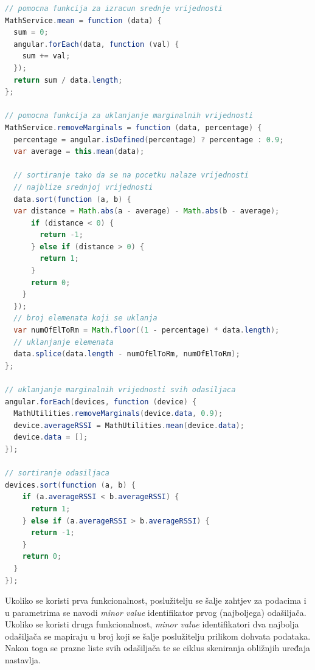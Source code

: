 \begin{lstlisting}[language=java, morekeywords={var,function}]
// pomocna funkcija za izracun srednje vrijednosti
MathService.mean = function (data) {
  sum = 0;
  angular.forEach(data, function (val) {
    sum += val;
  });
  return sum / data.length;
};

// pomocna funkcija za uklanjanje marginalnih vrijednosti
MathService.removeMarginals = function (data, percentage) {
  percentage = angular.isDefined(percentage) ? percentage : 0.9;
  var average = this.mean(data);
  
  // sortiranje tako da se na pocetku nalaze vrijednosti
  // najblize srednjoj vrijednosti
  data.sort(function (a, b) {
  var distance = Math.abs(a - average) - Math.abs(b - average);
      if (distance < 0) {
        return -1;
      } else if (distance > 0) {
        return 1;
      }
      return 0;
    }
  });
  // broj elemenata koji se uklanja
  var numOfElToRm = Math.floor((1 - percentage) * data.length);
  // uklanjanje elemenata
  data.splice(data.length - numOfElToRm, numOfElToRm);
};

// uklanjanje marginalnih vrijednosti svih odasiljaca
angular.forEach(devices, function (device) {
  MathUtilities.removeMarginals(device.data, 0.9);
  device.averageRSSI = MathUtilities.mean(device.data);
  device.data = [];
});

// sortiranje odasiljaca
devices.sort(function (a, b) {
    if (a.averageRSSI < b.averageRSSI) {
      return 1;
    } else if (a.averageRSSI > b.averageRSSI) {
      return -1;
    }
    return 0;
  }
});
\end{lstlisting}

Ukoliko se koristi prva funkcionalnost, poslužitelju se šalje zahtjev za podacima i u parametrima se navodi \textit{minor value} identifikator prvog (najboljega) odašiljača. 
Ukoliko se koristi druga funkcionalnost, \textit{minor value} identifikatori dva najbolja odašiljača se mapiraju u broj koji se šalje poslužitelju prilikom dohvata podataka. 
Nakon toga se prazne liste svih odašiljača te se ciklus skeniranja obližnjih uređaja nastavlja.

